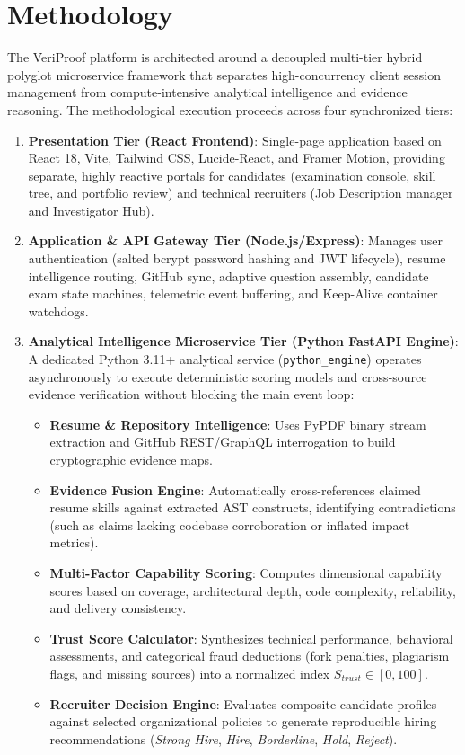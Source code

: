 \section{Methodology}
The VeriProof platform is architected around a decoupled multi-tier hybrid polyglot microservice framework that separates high-concurrency client session management from compute-intensive analytical intelligence and evidence reasoning. The methodological execution proceeds across four synchronized tiers:

\begin{enumerate}
    \item \textbf{Presentation Tier (React Frontend)}:
    Single-page application based on React 18, Vite, Tailwind CSS, Lucide-React, and Framer Motion, providing separate, highly reactive portals for candidates (examination console, skill tree, and portfolio review) and technical recruiters (Job Description manager and Investigator Hub).

    \item \textbf{Application \& API Gateway Tier (Node.js/Express)}:
    Manages user authentication (salted bcrypt password hashing and JWT lifecycle), resume intelligence routing, GitHub sync, adaptive question assembly, candidate exam state machines, telemetric event buffering, and Keep-Alive container watchdogs.

    \item \textbf{Analytical Intelligence Microservice Tier (Python FastAPI Engine)}:
    A dedicated Python 3.11+ analytical service (\texttt{python\_engine}) operates asynchronously to execute deterministic scoring models and cross-source evidence verification without blocking the main event loop:
    \begin{itemize}
        \item \textbf{Resume \& Repository Intelligence}: Uses PyPDF binary stream extraction and GitHub REST/GraphQL interrogation to build cryptographic evidence maps.
        \item \textbf{Evidence Fusion Engine}: Automatically cross-references claimed resume skills against extracted AST constructs, identifying contradictions (such as claims lacking codebase corroboration or inflated impact metrics).
        \item \textbf{Multi-Factor Capability Scoring}: Computes dimensional capability scores based on coverage, architectural depth, code complexity, reliability, and delivery consistency.
        \item \textbf{Trust Score Calculator}: Synthesizes technical performance, behavioral assessments, and categorical fraud deductions (fork penalties, plagiarism flags, and missing sources) into a normalized index $S_{trust} \in [0, 100]$.
        \item \textbf{Recruiter Decision Engine}: Evaluates composite candidate profiles against selected organizational policies to generate reproducible hiring recommendations (\textit{Strong Hire}, \textit{Hire}, \textit{Borderline}, \textit{Hold}, \textit{Reject}).
    \end{itemize}


\end{enumerate}
